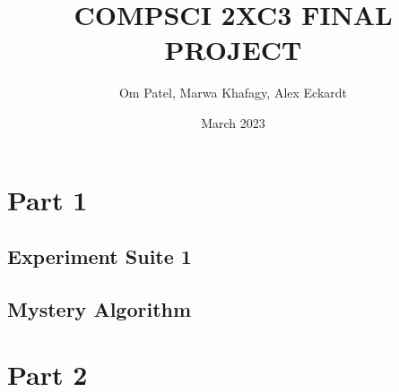 \documentclass[12pt]{article}
\author{Om Patel, Marwa Khafagy, Alex Eckardt}
\title{COMPSCI 2XC3 FINAL PROJECT}
\date{March 2023}
\begin{document}
\maketitle

\newpage

\tableofcontents

\newpage

\section{Part 1}

\subsection{Experiment Suite 1}

\newpage

\subsection{Mystery Algorithm}



\newpage

\section{Part 2}
\end{document}
